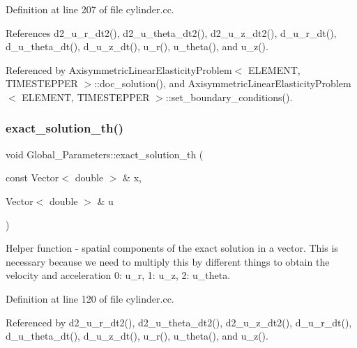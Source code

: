 Definition at line 207 of file cylinder.\+cc.



References d2\+\_\+u\+\_\+r\+\_\+dt2(), d2\+\_\+u\+\_\+theta\+\_\+dt2(), d2\+\_\+u\+\_\+z\+\_\+dt2(), d\+\_\+u\+\_\+r\+\_\+dt(), d\+\_\+u\+\_\+theta\+\_\+dt(), d\+\_\+u\+\_\+z\+\_\+dt(), u\+\_\+r(), u\+\_\+theta(), and u\+\_\+z().



Referenced by Axisymmetric\+Linear\+Elasticity\+Problem$<$ E\+L\+E\+M\+E\+N\+T, T\+I\+M\+E\+S\+T\+E\+P\+P\+E\+R $>$\+::doc\+\_\+solution(), and Axisymmetric\+Linear\+Elasticity\+Problem$<$ E\+L\+E\+M\+E\+N\+T, T\+I\+M\+E\+S\+T\+E\+P\+P\+E\+R $>$\+::set\+\_\+boundary\+\_\+conditions().

\mbox{\label{namespaceGlobal__Parameters_a42f4ce30b09a582bb2d85ddb6f087f80}} 
\subsubsection{\texorpdfstring{exact\+\_\+solution\+\_\+th()}{exact\_solution\_th()}}
{\footnotesize\ttfamily void Global\+\_\+\+Parameters\+::exact\+\_\+solution\+\_\+th (\begin{DoxyParamCaption}\item[{const Vector$<$ double $>$ \&}]{x,  }\item[{Vector$<$ double $>$ \&}]{u }\end{DoxyParamCaption})}



Helper function -\/ spatial components of the exact solution in a vector. This is necessary because we need to multiply this by different things to obtain the velocity and acceleration 0\+: u\+\_\+r, 1\+: u\+\_\+z, 2\+: u\+\_\+theta. 



Definition at line 120 of file cylinder.\+cc.



Referenced by d2\+\_\+u\+\_\+r\+\_\+dt2(), d2\+\_\+u\+\_\+theta\+\_\+dt2(), d2\+\_\+u\+\_\+z\+\_\+dt2(), d\+\_\+u\+\_\+r\+\_\+dt(), d\+\_\+u\+\_\+theta\+\_\+dt(), d\+\_\+u\+\_\+z\+\_\+dt(), u\+\_\+r(), u\+\_\+theta(), and u\+\_\+z().

\mbox{\label{namespaceGlobal__Parameters_ae600c7d1b0928a5cb532fa3a93bab338}} 
